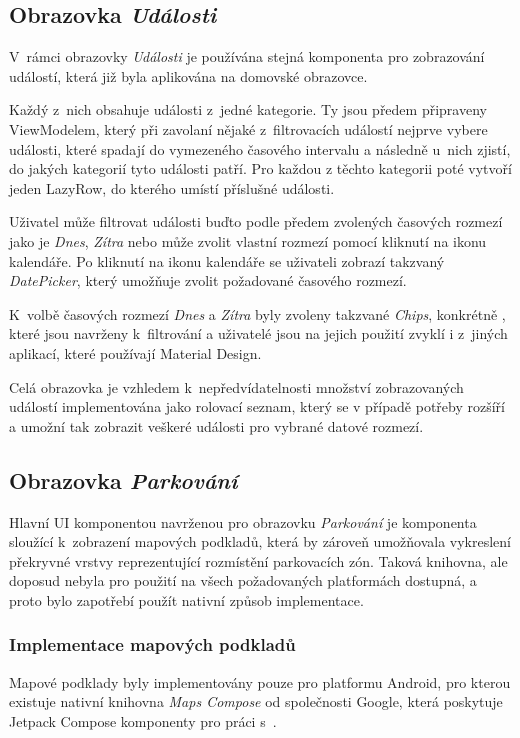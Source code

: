 \subsection{Obrazovka \textit{Události}}

V~rámci obrazovky \textit{Události} je používána stejná komponenta pro zobrazování událostí, která již byla aplikována na domovské obrazovce. 


Každý z~nich obsahuje události z~jedné kategorie. Ty jsou předem připraveny ViewModelem, který při zavolaní nějaké z~filtrovacích
událostí nejprve vybere události, které spadají do vymezeného časového intervalu a následně u~nich zjistí, do jakých kategorií tyto
události patří. Pro každou z těchto kategorii poté vytvoří jeden LazyRow, do kterého umístí příslušné události.

Uživatel může filtrovat události buďto podle předem zvolených časových rozmezí jako je \textit{Dnes}, \textit{Zítra} nebo může zvolit vlastní 
rozmezí pomocí kliknutí na ikonu kalendáře. Po kliknutí na ikonu kalendáře se uživateli zobrazí takzvaný \textit{DatePicker}, který umožňuje zvolit požadované časového rozmezí.

K~volbě časových rozmezí \textit{Dnes} a \textit{Zítra} byly zvoleny takzvané \textit{Chips}, konkrétně , které jsou 
navrženy k~filtrování a uživatelé jsou na jejich použití zvyklí i z~jiných aplikací, které používají Material Design.

Celá obrazovka je vzhledem k~nepředvídatelnosti množství zobrazovaných událostí implementována jako rolovací seznam, který se v případě potřeby
rozšíří a umožní tak zobrazit veškeré události pro vybrané datové rozmezí.

\subsection{Obrazovka \textit{Parkování}} \label{parkingScreenImpl}
Hlavní UI komponentou navrženou pro obrazovku \textit{Parkování} je komponenta sloužící k~zobrazení mapových podkladů, která by zároveň umožňovala 
vykreslení překryvné vrstvy reprezentující rozmístění parkovacích zón. Taková knihovna, ale doposud nebyla pro použití na všech požadovaných 
platformách dostupná, a proto bylo zapotřebí použít nativní způsob implementace. 

\subsubsection*{Implementace mapových podkladů}
Mapové podklady byly implementovány pouze pro platformu Android, pro kterou existuje nativní knihovna \textit{Maps Compose} od společnosti Google, 
která poskytuje Jetpack Compose komponenty pro práci s~.

